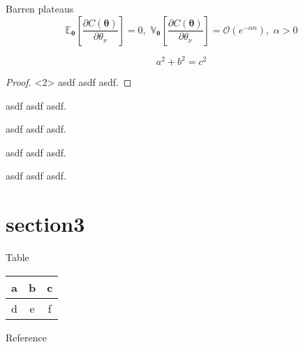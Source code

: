 \documentclass[dvipdfmx,10pt,aspectratio=169]{beamer}
\begin{document}
\begin{frame}
    \begin{definition}Barren plateaus\cite{mcclean2018barren}
        $$ \mathbb{E}_{\boldsymbol{\theta}}\left[\frac{\partial C(\boldsymbol{\theta})}{\partial \theta_\nu}\right] = 0, \,\,\mathbb{V}_{\boldsymbol{\theta}}\left[\frac{\partial C(\boldsymbol{\theta})}{\partial \theta_\nu}\right] = \mathcal{O}(e^{-\alpha n}), \,\,\alpha > 0 $$
    \end{definition}
\end{frame}




\begin{frame}
    \begin{theorem}
        $$ a^2 + b^2 = c^2 $$
    \end{theorem}

    \begin{proof}<2>
        asdf asdf asdf.
    \end{proof}

\end{frame}





\begin{frame}
    \begin{warning}
        asdf asdf asdf.
    \end{warning}

    \begin{example}
        asdf asdf asdf.
    \end{example}

    \begin{important}
        asdf asdf asdf.
    \end{important}

    \begin{remark}
        asdf asdf asdf.
    \end{remark}
\end{frame}





\section{section3}

\begin{frame}{Table}
    \begin{table}[]
        \begin{tabular}{|l|c|c|}
        \hline
        a & b & c \\ \hline
        d & e & f \\ \hline
        \end{tabular}
    \end{table}
\end{frame}




\begin{frame}{Reference}
    \scriptsize
    \beamertemplatetextbibitems
    
    
\end{frame}
\end{document}
